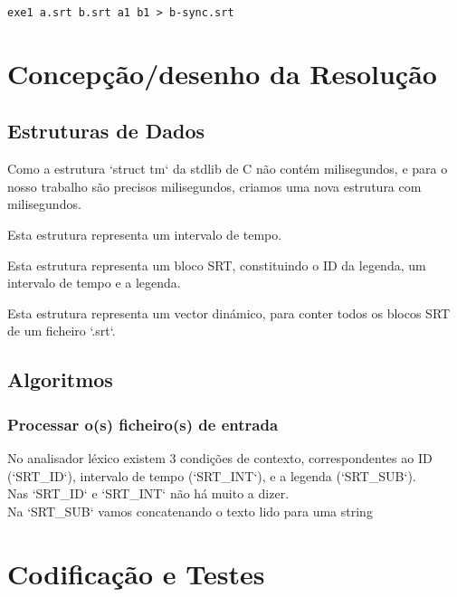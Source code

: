 \documentclass{report}
\begin{document}
\begin{verbatim}
exe1 a.srt b.srt a1 b1 > b-sync.srt
\end{verbatim}

\chapter{Concepção/desenho da Resolução}
\section{Estruturas de Dados}

Como a estrutura `struct tm` da stdlib de C não contém milisegundos, e para o nosso trabalho são precisos milisegundos, criamos uma nova estrutura com milisegundos.

Esta estrutura representa um intervalo de tempo.

Esta estrutura representa um bloco SRT, constituindo o ID da legenda, um intervalo de tempo e a legenda.

Esta estrutura representa um vector dinámico, para conter todos os blocos SRT de um ficheiro `.srt`.

\section{Algoritmos}

\subsection{Processar o(s) ficheiro(s) de entrada}

No analisador léxico existem 3 condições de contexto, correspondentes ao ID (`SRT\_ID`), intervalo de tempo (`SRT\_INT`), e a legenda (`SRT\_SUB`).\\
Nas `SRT\_ID` e `SRT\_INT` não há muito a dizer.\\
Na `SRT\_SUB` vamos concatenando o texto lido para uma string

\chapter{Codificação e Testes}
\end{document}

